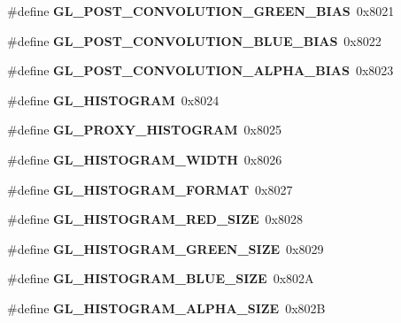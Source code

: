 \begin{DoxyCompactItemize}
\item 
\#define {\bfseries G\+L\+\_\+\+P\+O\+S\+T\+\_\+\+C\+O\+N\+V\+O\+L\+U\+T\+I\+O\+N\+\_\+\+G\+R\+E\+E\+N\+\_\+\+B\+I\+A\+S}~0x8021\label{_s_d_l__opengl_8h_a0a42963578aad647b5b86d5b0e5f2778}

\item 
\#define {\bfseries G\+L\+\_\+\+P\+O\+S\+T\+\_\+\+C\+O\+N\+V\+O\+L\+U\+T\+I\+O\+N\+\_\+\+B\+L\+U\+E\+\_\+\+B\+I\+A\+S}~0x8022\label{_s_d_l__opengl_8h_a095942ecfec0da250c326a71fb00db39}

\item 
\#define {\bfseries G\+L\+\_\+\+P\+O\+S\+T\+\_\+\+C\+O\+N\+V\+O\+L\+U\+T\+I\+O\+N\+\_\+\+A\+L\+P\+H\+A\+\_\+\+B\+I\+A\+S}~0x8023\label{_s_d_l__opengl_8h_a194d32b291e6ce5f66c9c0c02d4e01ec}

\item 
\#define {\bfseries G\+L\+\_\+\+H\+I\+S\+T\+O\+G\+R\+A\+M}~0x8024\label{_s_d_l__opengl_8h_adc63b539a0896bef2cab522bc7711947}

\item 
\#define {\bfseries G\+L\+\_\+\+P\+R\+O\+X\+Y\+\_\+\+H\+I\+S\+T\+O\+G\+R\+A\+M}~0x8025\label{_s_d_l__opengl_8h_a2716960c964c19c0f731212a9d87353e}

\item 
\#define {\bfseries G\+L\+\_\+\+H\+I\+S\+T\+O\+G\+R\+A\+M\+\_\+\+W\+I\+D\+T\+H}~0x8026\label{_s_d_l__opengl_8h_ab82a54c12a829fc926927616b64ca8d7}

\item 
\#define {\bfseries G\+L\+\_\+\+H\+I\+S\+T\+O\+G\+R\+A\+M\+\_\+\+F\+O\+R\+M\+A\+T}~0x8027\label{_s_d_l__opengl_8h_add0e20ededc17589551b9b24d07695d4}

\item 
\#define {\bfseries G\+L\+\_\+\+H\+I\+S\+T\+O\+G\+R\+A\+M\+\_\+\+R\+E\+D\+\_\+\+S\+I\+Z\+E}~0x8028\label{_s_d_l__opengl_8h_a7ff8aa546601bfc5ddabd57e3d74e9c9}

\item 
\#define {\bfseries G\+L\+\_\+\+H\+I\+S\+T\+O\+G\+R\+A\+M\+\_\+\+G\+R\+E\+E\+N\+\_\+\+S\+I\+Z\+E}~0x8029\label{_s_d_l__opengl_8h_a255c0a3d5818cb80ba4c74525a62f6f8}

\item 
\#define {\bfseries G\+L\+\_\+\+H\+I\+S\+T\+O\+G\+R\+A\+M\+\_\+\+B\+L\+U\+E\+\_\+\+S\+I\+Z\+E}~0x802\+A\label{_s_d_l__opengl_8h_a5ba7b608a146532635aa3a058c14e67e}

\item 
\#define {\bfseries G\+L\+\_\+\+H\+I\+S\+T\+O\+G\+R\+A\+M\+\_\+\+A\+L\+P\+H\+A\+\_\+\+S\+I\+Z\+E}~0x802\+B\label{_s_d_l__opengl_8h_adfd6f0543d2f48afa4c05d56d9d37748}


\end{DoxyCompactItemize}
